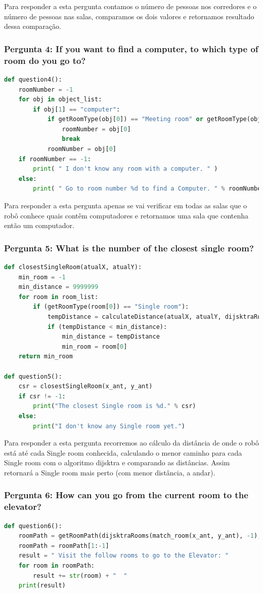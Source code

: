 \documentclass{article}
\begin{document}
Para responder a esta pergunta contamos o número de pessoas nos corredores e o número de pessoas nas salas, comparamos os dois valores e retornamos resultado dessa comparação.

\subsubsection{Pergunta 4: If you want to find a computer, to which type of room do you go to?}
\begin{lstlisting}[language=Python]
  def question4():
	roomNumber = -1
	for obj in object_list:
		if obj[1] == "computer":
			if getRoomType(obj[0]) == "Meeting room" or getRoomType(obj[0]) == "Generic room": # Only for privacy :)  
				roomNumber = obj[0]
				break
			roomNumber = obj[0]
	if roomNumber == -1:
		print( " I don't know any room with a computer. " )
	else:
		print( " Go to room number %d to find a Computer. " % roomNumber )
\end{lstlisting}

Para responder a esta pergunta apenas se vai verificar em todas as salas que o robô conhece quais contêm computadores e retornamos uma sala que contenha então um computador.

\subsubsection{Pergunta 5: What is the number of the closest single room?}
\begin{lstlisting}[language=Python]
  def closestSingleRoom(atualX, atualY):
	min_room = -1
	min_distance = 9999999
	for room in room_list:
		if (getRoomType(room[0]) == "Single room"):
			tempDistance = calculateDistance(atualX, atualY, dijsktraRooms(match_room(atualX, atualY), room[0]))
			if (tempDistance < min_distance):
				min_distance = tempDistance
				min_room = room[0]
	return min_room

def question5():
	csr = closestSingleRoom(x_ant, y_ant)
	if csr != -1:
		print("The closest Single room is %d." % csr)
	else:
		print("I don't know any Single room yet.")
\end{lstlisting}

Para responder a esta pergunta recorremos ao cálculo da distância de onde o robô está até cada Single room conhecida, calculando o menor caminho para cada Single room com o algoritmo dijsktra e comparando as distâncias.
Assim retornará a Single room mais perto (com menor distância, a andar).

\subsubsection{Pergunta 6: How can you go from the current room to the elevator?}
\begin{lstlisting}[language=Python]
  def question6():
	roomPath = getRoomPath(dijsktraRooms(match_room(x_ant, y_ant), -1), match_room(x_ant, y_ant))
	roomPath = roomPath[1:-1]
	result = " Visit the follow rooms to go to the Elevator: "
	for room in roomPath:
		result += str(room) + "  "
	print(result)
\end{lstlisting}
\end{document}
